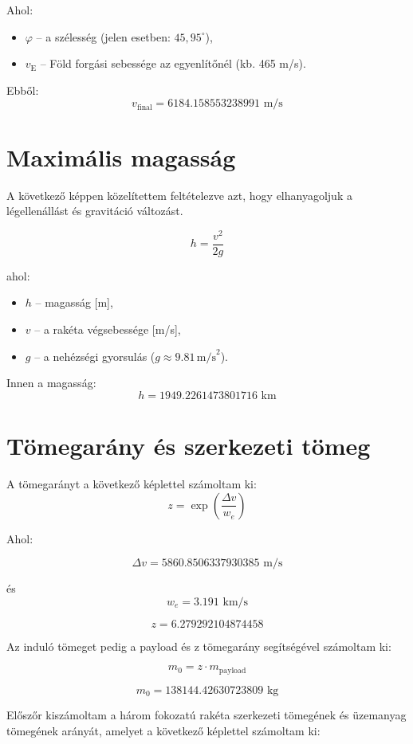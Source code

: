 \documentclass[a4paper,12pt]{article}
\begin{document}
Ahol:
\begin{itemize}
  \item \( \varphi \) – a szélesség (jelen esetben: \(45{,}95^\circ\)),
  \item \( v_{\text{E}} \) – Föld forgási sebessége az egyenlítőnél (kb. 465 m/s).
\end{itemize}

Ebből:
\[
v_{\text{final}} = 6184.158553238991  \text{ m/s}
\]

\section{Maximális magasság}

A következő képpen közelítettem feltételezve azt, hogy elhanyagoljuk a légellenállást és gravitáció változást.

\[
h = \frac{v^2}{2g}
\]

ahol:
\begin{itemize}
  \item \( h \) – magasság [m],
  \item \( v \) – a rakéta végsebessége [m/s],
  \item \( g \) – a nehézségi gyorsulás (\( g \approx 9.81 \, \text{m/s}^2 \)).
\end{itemize}

Innen a magasság:
\[
h = 1949.2261473801716 \text{ km}
\]

\section{Tömegarány és szerkezeti tömeg}

A tömegarányt a következő képlettel számoltam ki:
\[
z = \exp\left(\frac{\Delta v}{w_e}\right)
\]

Ahol:

\[
\Delta v = 5860.8506337930385 \text{ m/s}
\]

és
\[
w_e = 3.191 \text{ km/s}
\]

\[
z = 6.279292104874458
\]

Az induló tömeget pedig a payload és z tömegarány segítségével számoltam ki:

\[
m_0 = z \cdot m_{\text{payload}}
\]

\[
m_0 = 138144.42630723809 \text{ kg}
\]

Előszőr kiszámoltam a három fokozatú rakéta szerkezeti tömegének és üzemanyag tömegének arányát, amelyet a következő képlettel számoltam ki:
\end{document}

